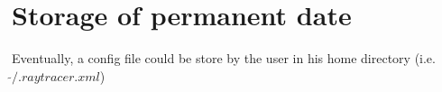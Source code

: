 \section{Storage of permanent date}
Eventually, a config file could be store by the user in his home directory (i.e. $\widetilde{}/.raytracer.xml$)

